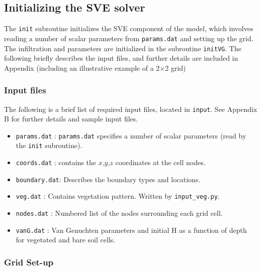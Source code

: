 \documentclass{article}
\newcommand{\code}[1]{\texttt{#1}}
\begin{document}
\subsection{Initializing the SVE solver}
\label{SVEinit}
	
The \code{init} subroutine initializes the SVE component of the model,  which involves reading a number of scalar parameters from  \code{params.dat} and setting up the grid.
 The infiltration and parameters  are initialized in the subroutine \code{initVG}.  The following briefly describes the input files, and further details are included in Appendix (including an illustrative example of a  2$\times$2 grid)
  
\subsubsection*{Input files}

The following is a brief list of required input files, located in \code{input}. See Appendix B for further details and sample input files.

\begin{itemize}

	\item \code{params.dat} : \code{params.dat} specifies a number of scalar parameters (read by the \code{init} subroutine).  

	\item \code{coords.dat} : contains the $x$,$y$,$z$ coordinates at the cell nodes.

	\item \code{boundary.dat}: Describes the boundary types and locations.

	\item \code{veg.dat} : Contains vegetation pattern. Written by \code{input\_veg.py}. 

	\item \code{nodes.dat} : Numbered list of the nodes surrounding each grid cell.

	\item \code{vanG.dat} : Van Genuchten parameters and initial H as a function of depth for vegetated and bare soil cells. 

\end{itemize}





\subsubsection*{Grid Set-up}
\end{document}
